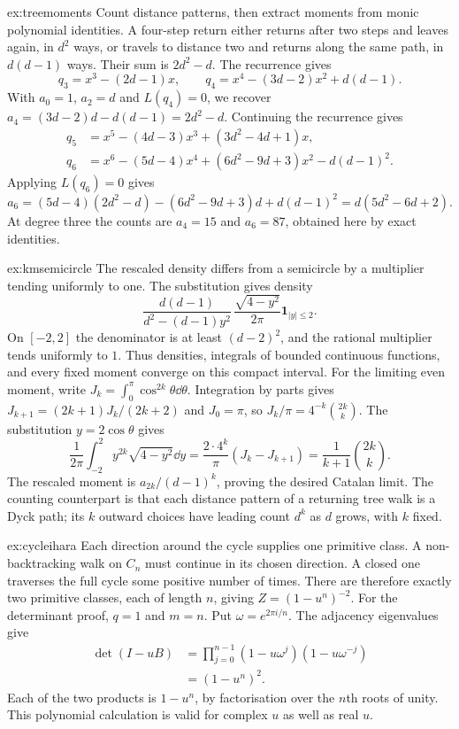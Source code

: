 \begin{solution}{ex:treemoments}
\idea Count distance patterns, then extract moments from monic polynomial identities.
\writeup A four-step return either returns after two steps and leaves again, in $d^2$ ways, or travels to distance two and returns along the same path, in $d(d-1)$ ways. Their sum is $2d^2-d$.
The recurrence gives
\[
q_3=x^3-(2d-1)x,\qquad
q_4=x^4-(3d-2)x^2+d(d-1).
\]
With $a_0=1$, $a_2=d$ and $L(q_4)=0$, we recover $a_4=(3d-2)d-d(d-1)=2d^2-d$. Continuing the recurrence gives
\[
\begin{aligned}
q_5&=x^5-(4d-3)x^3+(3d^2-4d+1)x,\\
q_6&=x^6-(5d-4)x^4+(6d^2-9d+3)x^2-d(d-1)^2.
\end{aligned}
\]
Applying $L(q_6)=0$ gives
\[
a_6=(5d-4)(2d^2-d)-(6d^2-9d+3)d+d(d-1)^2
=d(5d^2-6d+2).
\]
At degree three the counts are $a_4=15$ and $a_6=87$, obtained here by exact identities.
\end{solution}

\begin{solution}{ex:kmsemicircle}
\idea The rescaled density differs from a semicircle by a multiplier tending uniformly to one.
\writeup The substitution gives density
\[
\frac{d(d-1)}{d^2-(d-1)y^2}\,
\frac{\sqrt{4-y^2}}{2\pi}\mathbf1_{|y|\le2}.
\]
On $[-2,2]$ the denominator is at least $(d-2)^2$, and the rational multiplier tends uniformly to $1$. Thus densities, integrals of bounded continuous functions, and every fixed moment converge on this compact interval.
For the limiting even moment, write $J_k=\int_0^\pi\cos^{2k}\theta\dd\theta$. Integration by parts gives $J_{k+1}=(2k+1)J_k/(2k+2)$ and $J_0=\pi$, so $J_k/\pi=4^{-k}\binom{2k}{k}$. The substitution $y=2\cos\theta$ gives
\[
\frac1{2\pi}\int_{-2}^2y^{2k}\sqrt{4-y^2}\dd y
=\frac{2\cdot4^k}{\pi}(J_k-J_{k+1})
=\frac1{k+1}\binom{2k}{k}.
\]
The rescaled moment is $a_{2k}/(d-1)^k$, proving the desired Catalan limit. The counting counterpart is that each distance pattern of a returning tree walk is a Dyck path; its $k$ outward choices have leading count $d^k$ as $d$ grows, with $k$ fixed.
\end{solution}

\begin{solution}{ex:cycleihara}
\idea Each direction around the cycle supplies one primitive class.
\writeup A non-backtracking walk on $C_n$ must continue in its chosen direction. A closed one traverses the full cycle some positive number of times. There are therefore exactly two primitive classes, each of length $n$, giving $Z=(1-u^n)^{-2}$.
For the determinant proof, $q=1$ and $m=n$. Put $\omega=e^{2\pi i/n}$. The adjacency eigenvalues give
\[
\begin{aligned}
\det(I-uB)&=\prod_{j=0}^{n-1}(1-u\omega^j)(1-u\omega^{-j})\\
&=(1-u^n)^2.
\end{aligned}
\]
Each of the two products is $1-u^n$, by factorisation over the $n$th roots of unity. This polynomial calculation is valid for complex $u$ as well as real $u$.
\end{solution}

